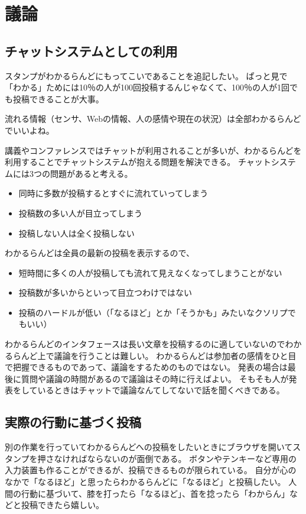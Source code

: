 \section{議論}

\subsection{チャットシステムとしての利用}
スタンプがわかるらんどにもってこいであることを追記したい。
ぱっと見で「わかる」ためには10％の人が100回投稿するんじゃなくて、100％の人が1回でも投稿できることが大事。

流れる情報（センサ、Webの情報、人の感情や現在の状況）は全部わかるらんどでいいよね。

講義やコンファレンスではチャットが利用されることが多いが、わかるらんどを利用することでチャットシステムが抱える問題を解決できる。
チャットシステムには3つの問題があると考える。

\begin{itemize}
\item 同時に多数が投稿するとすぐに流れていってしまう
\item 投稿数の多い人が目立ってしまう
\item 投稿しない人は全く投稿しない
\end{itemize}

わかるらんどは全員の最新の投稿を表示するので、

\begin{itemize}
\item 短時間に多くの人が投稿しても流れて見えなくなってしまうことがない
\item 投稿数が多いからといって目立つわけではない
\item 投稿のハードルが低い（「なるほど」とか「そうかも」みたいなクソリプでもいい）
\end{itemize}

わかるらんどのインタフェースは長い文章を投稿するのに適していないのでわかるらんど上で議論を行うことは難しい。
わかるらんどは参加者の感情をひと目で把握できるものであって、議論をするためのものではない。
発表の場合は最後に質問や議論の時間があるので議論はその時に行えばよい。
そもそも人が発表をしているときはチャットで議論なんてしてないで話を聞くべきである。

\subsection{実際の行動に基づく投稿}

別の作業を行っていてわかるらんどへの投稿をしたいときにブラウザを開いてスタンプを押さなければならないのが面倒である。
ボタンやテンキーなど専用の入力装置も作ることができるが、投稿できるものが限られている。
自分が心のなかで「なるほど」と思ったらわかるらんどに「なるほど」と投稿したい。
人間の行動に基づいて、膝を打ったら「なるほど」、首を捻ったら「わからん」などと投稿できたら嬉しい。

